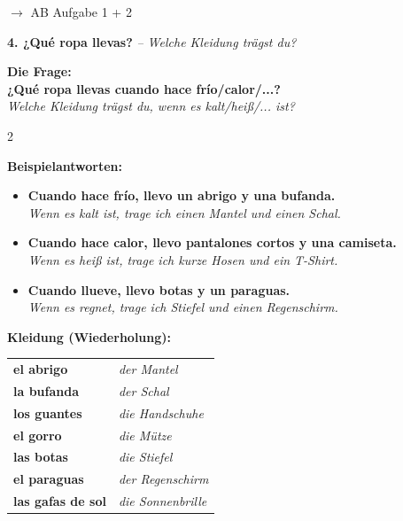 \documentclass[11pt, a4paper]{article}
\newcommand{\seriftext}[1]{{\fontfamily{ppl}\selectfont #1}}
\newcommand{\es}[1]{\seriftext{\textbf{#1}}}
\newcommand{\de}[1]{\textit{\textcolor{akzent}{#1}}}
\newcommand{\abmark}[1]{{\footnotesize\textcolor{akzent}{$\rightarrow$ AB #1}}}
\newcommand{\abschnitt}[2]{\noindent\textbf{\large #1. #2}}
\begin{document}
\abmark{Aufgabe 1 + 2}

\vspace{8pt}

\abschnitt{4}{¿Qué ropa llevas?} \de{-- Welche Kleidung trägst du?}

\vspace{4pt}

\begin{grammatikbox}
\textbf{Die Frage:}\\[2pt]
\es{¿Qué ropa llevas cuando hace frío/calor/...?}\\
\de{Welche Kleidung trägst du, wenn es kalt/heiß/... ist?}
\end{grammatikbox}

\vspace{4pt}

\begin{multicols}{2}

\textbf{Beispielantworten:}

\begin{itemize}[leftmargin=1.2em, itemsep=2pt]
    \item \es{Cuando hace frío, llevo un abrigo y una bufanda.}\\
          \de{Wenn es kalt ist, trage ich einen Mantel und einen Schal.}
    \item \es{Cuando hace calor, llevo pantalones cortos y una camiseta.}\\
          \de{Wenn es heiß ist, trage ich kurze Hosen und ein T-Shirt.}
    \item \es{Cuando llueve, llevo botas y un paraguas.}\\
          \de{Wenn es regnet, trage ich Stiefel und einen Regenschirm.}
\end{itemize}

\columnbreak

\textbf{Kleidung (Wiederholung):}

\begin{tabular}{@{}ll@{}}
\es{el abrigo} & \de{der Mantel} \\[0.3em]
\es{la bufanda} & \de{der Schal} \\[0.3em]
\es{los guantes} & \de{die Handschuhe} \\[0.3em]
\es{el gorro} & \de{die Mütze} \\[0.3em]
\es{las botas} & \de{die Stiefel} \\[0.3em]
\es{el paraguas} & \de{der Regenschirm} \\[0.3em]
\es{las gafas de sol} & \de{die Sonnenbrille} \\
\end{tabular}

\end{multicols}
\end{document}
